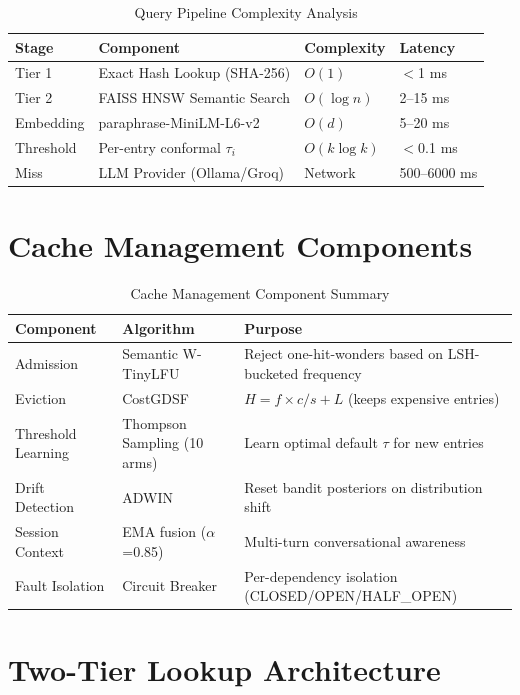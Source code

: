 \documentclass[12pt,a4paper]{report}
\begin{document}
\begin{table}[H]
\centering
\begin{tabular}{llll}
\toprule
\textbf{Stage} & \textbf{Component} & \textbf{Complexity} & \textbf{Latency} \\
\midrule
Tier 1 & Exact Hash Lookup (SHA-256) & $O(1)$ & $<$1 ms \\
Tier 2 & FAISS HNSW Semantic Search & $O(\log n)$ & 2--15 ms \\
Embedding & paraphrase-MiniLM-L6-v2 & $O(d)$ & 5--20 ms \\
Threshold & Per-entry conformal $\tau_i$ & $O(k \log k)$ & $<$0.1 ms \\
Miss & LLM Provider (Ollama/Groq) & Network & 500--6000 ms \\
\bottomrule
\end{tabular}
\caption{Query Pipeline Complexity Analysis}
\label{tab:pipeline}
\end{table}

\section{Cache Management Components}

\begin{table}[H]
\centering
\begin{tabular}{p{3cm}p{4.5cm}p{6cm}}
\toprule
\textbf{Component} & \textbf{Algorithm} & \textbf{Purpose} \\
\midrule
Admission & Semantic W-TinyLFU & Reject one-hit-wonders based on LSH-bucketed frequency \\
Eviction & CostGDSF & $H = f \times c / s + L$ (keeps expensive entries) \\
Threshold Learning & Thompson Sampling (10 arms) & Learn optimal default $\tau$ for new entries \\
Drift Detection & ADWIN & Reset bandit posteriors on distribution shift \\
Session Context & EMA fusion ($\alpha$=0.85) & Multi-turn conversational awareness \\
Fault Isolation & Circuit Breaker & Per-dependency isolation (CLOSED/OPEN/HALF\_OPEN) \\
\bottomrule
\end{tabular}
\caption{Cache Management Component Summary}
\label{tab:components}
\end{table}

\section{Two-Tier Lookup Architecture}
\end{document}

